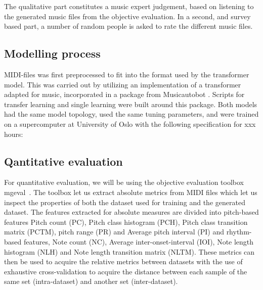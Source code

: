 \documentclass{IEEEtran}
\begin{document}
        The qualitative part constitutes a music expert judgement,
        based on listening to the generated music files from the objective evaluation.
        In a second, and survey based part, a number of random people is asked
        to rate the different music files.
        
        \subsection{Modelling process}
        MIDI-files was first preprocessed to fit into the format used by the transformer model.
        This was carried out by utilizing an implementation of a transformer adapted for music, 
        incorporated in a package from Musicautobot \cite{musicautobot}. Scripts for transfer learning and
        single learning were built around this package. Both models had the same model topology, used the same tuning parameters, and were trained on a supercomputer at University of Oslo
        with the following specification for xxx hours:

        \subsection{Qantitative evaluation}
        
        For quantitative evaluation, we will be using the objective
        evaluation toolbox mgeval~\cite{yang2020evaluation}.
        The toolbox let us extract absolute metrics from MIDI files
        which let us inspect the properties of both the dataset used
        for training and the generated dataset. The features extracted
        for absolute measures are divided into pitch-based features Pitch count (PC),
        Pitch class histogram (PCH), Pitch class transition matrix (PCTM),
        pitch range (PR) and Average pitch interval (PI) and rhythm-based features,
        Note count (NC), Average inter-onset-interval (IOI), Note length
        histogram (NLH) and Note length transition matrix (NLTM).
        These metrics can then be used to acquire the relative metrics between
        datasets with the use of exhaustive cross-validation to acquire the
        distance between each sample of the same set (intra-dataset) and another
        set (inter-dataset). 
        
\end{document}
